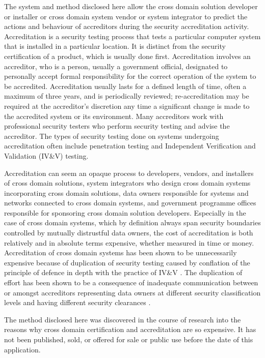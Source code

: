 \documentclass[12pt,letterpaper]{article}
\begin{document}
The system and method disclosed here allow the cross domain solution developer or installer
or cross domain system vendor or system integrator to predict the actions and behaviour of
accreditors during the security accreditation activity.  Accreditation is a security testing
process that tests a particular computer system that is installed in a particular location.
It is distinct from the security certification of a product, which is usually done first.
Accreditation involves an accreditor, who is a person, usually a government official,
designated to personally accept formal responsibility for the correct operation of the
system to be accredited.  Accreditation usually lasts for a defined length of time, often a
maximum of three years, and is periodically reviewed; re-accreditation may be required at
the accreditor's discretion any time a significant change is made to the accredited system
or its environment.  Many accreditors work with professional security testers who perform
security testing and advise the accreditor.  The types of security testing done on systems
undergoing accreditation often include penetration testing and Independent Verification and
Validation (IV\&V) testing.

Accreditation can seem an opaque process to developers, vendors, and installers of cross
domain solutions, system integrators who design cross domain systems incorporating cross
domain solutions, data owners responsible for systems and networks connected to cross domain
systems, and government programme offices responsible for sponsoring cross domain solution
developers.  Especially in the case of cross domain systems, which by definition always
span security boundaries controlled by mutually distrustful data owners, the cost of
accreditation is both relatively and in absolute terms expensive, whether measured in time
or money.  Accreditation of cross domain systems has been shown to be unnecessarily
expensive because of duplication of security testing caused by conflation of the principle
of defence in depth with the practice of IV\&V \cite{Loughry2010a}.  The duplication of
effort has been shown to be a consequence of inadequate communication between or amongst
accreditors representing data owners at different security classification levels and having
different security clearances \cite{Loughry2012a}.

The method disclosed here was discovered in the course of research into the reasons why
cross domain certification and accreditation are so expensive.  It has not been published,
sold, or offered for sale or public use before the date of this application.
\end{document}
